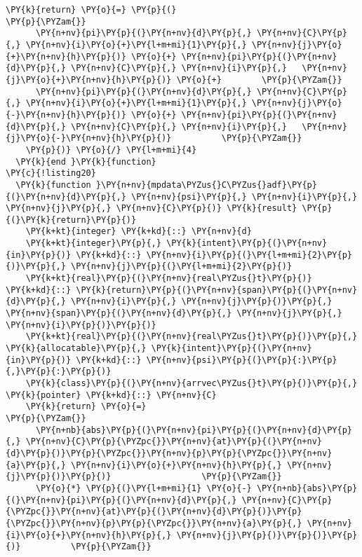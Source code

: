 \begin{Verbatim}[commandchars=\\\{\}]
    \PY{k}{return} \PY{o}{=} \PY{p}{(}                                         \PY{p}{\PYZam{}}
      \PY{n+nv}{pi}\PY{p}{(}\PY{n+nv}{d}\PY{p}{,} \PY{n+nv}{C}\PY{p}{,} \PY{n+nv}{i}\PY{o}{+}\PY{l+m+mi}{1}\PY{p}{,} \PY{n+nv}{j}\PY{o}{+}\PY{n+nv}{h}\PY{p}{)} \PY{o}{+} \PY{n+nv}{pi}\PY{p}{(}\PY{n+nv}{d}\PY{p}{,} \PY{n+nv}{C}\PY{p}{,} \PY{n+nv}{i}\PY{p}{,}   \PY{n+nv}{j}\PY{o}{+}\PY{n+nv}{h}\PY{p}{)} \PY{o}{+}        \PY{p}{\PYZam{}}
      \PY{n+nv}{pi}\PY{p}{(}\PY{n+nv}{d}\PY{p}{,} \PY{n+nv}{C}\PY{p}{,} \PY{n+nv}{i}\PY{o}{+}\PY{l+m+mi}{1}\PY{p}{,} \PY{n+nv}{j}\PY{o}{-}\PY{n+nv}{h}\PY{p}{)} \PY{o}{+} \PY{n+nv}{pi}\PY{p}{(}\PY{n+nv}{d}\PY{p}{,} \PY{n+nv}{C}\PY{p}{,} \PY{n+nv}{i}\PY{p}{,}   \PY{n+nv}{j}\PY{o}{-}\PY{n+nv}{h}\PY{p}{)}          \PY{p}{\PYZam{}}
    \PY{p}{)} \PY{o}{/} \PY{l+m+mi}{4}               
  \PY{k}{end }\PY{k}{function}
\PY{c}{!listing20}
  \PY{k}{function }\PY{n+nv}{mpdata\PYZus{}C\PYZus{}adf}\PY{p}{(}\PY{n+nv}{d}\PY{p}{,} \PY{n+nv}{psi}\PY{p}{,} \PY{n+nv}{i}\PY{p}{,} \PY{n+nv}{j}\PY{p}{,} \PY{n+nv}{C}\PY{p}{)} \PY{k}{result} \PY{p}{(}\PY{k}{return}\PY{p}{)}
    \PY{k+kt}{integer} \PY{k+kd}{::} \PY{n+nv}{d}
    \PY{k+kt}{integer}\PY{p}{,} \PY{k}{intent}\PY{p}{(}\PY{n+nv}{in}\PY{p}{)} \PY{k+kd}{::} \PY{n+nv}{i}\PY{p}{(}\PY{l+m+mi}{2}\PY{p}{)}\PY{p}{,} \PY{n+nv}{j}\PY{p}{(}\PY{l+m+mi}{2}\PY{p}{)}
    \PY{k+kt}{real}\PY{p}{(}\PY{n+nv}{real\PYZus{}t}\PY{p}{)} \PY{k+kd}{::} \PY{k}{return}\PY{p}{(}\PY{n+nv}{span}\PY{p}{(}\PY{n+nv}{d}\PY{p}{,} \PY{n+nv}{i}\PY{p}{,} \PY{n+nv}{j}\PY{p}{)}\PY{p}{,} \PY{n+nv}{span}\PY{p}{(}\PY{n+nv}{d}\PY{p}{,} \PY{n+nv}{j}\PY{p}{,} \PY{n+nv}{i}\PY{p}{)}\PY{p}{)}
    \PY{k+kt}{real}\PY{p}{(}\PY{n+nv}{real\PYZus{}t}\PY{p}{)}\PY{p}{,} \PY{k}{allocatable}\PY{p}{,} \PY{k}{intent}\PY{p}{(}\PY{n+nv}{in}\PY{p}{)} \PY{k+kd}{::} \PY{n+nv}{psi}\PY{p}{(}\PY{p}{:}\PY{p}{,}\PY{p}{:}\PY{p}{)} 
    \PY{k}{class}\PY{p}{(}\PY{n+nv}{arrvec\PYZus{}t}\PY{p}{)}\PY{p}{,} \PY{k}{pointer} \PY{k+kd}{::} \PY{n+nv}{C}
    \PY{k}{return} \PY{o}{=}                                           \PY{p}{\PYZam{}}
      \PY{n+nb}{abs}\PY{p}{(}\PY{n+nv}{pi}\PY{p}{(}\PY{n+nv}{d}\PY{p}{,} \PY{n+nv}{C}\PY{p}{\PYZpc{}}\PY{n+nv}{at}\PY{p}{(}\PY{n+nv}{d}\PY{p}{)}\PY{p}{\PYZpc{}}\PY{n+nv}{p}\PY{p}{\PYZpc{}}\PY{n+nv}{a}\PY{p}{,} \PY{n+nv}{i}\PY{o}{+}\PY{n+nv}{h}\PY{p}{,} \PY{n+nv}{j}\PY{p}{)}\PY{p}{)}                  \PY{p}{\PYZam{}}
      \PY{o}{*} \PY{p}{(}\PY{l+m+mi}{1} \PY{o}{-} \PY{n+nb}{abs}\PY{p}{(}\PY{n+nv}{pi}\PY{p}{(}\PY{n+nv}{d}\PY{p}{,} \PY{n+nv}{C}\PY{p}{\PYZpc{}}\PY{n+nv}{at}\PY{p}{(}\PY{n+nv}{d}\PY{p}{)}\PY{p}{\PYZpc{}}\PY{n+nv}{p}\PY{p}{\PYZpc{}}\PY{n+nv}{a}\PY{p}{,} \PY{n+nv}{i}\PY{o}{+}\PY{n+nv}{h}\PY{p}{,} \PY{n+nv}{j}\PY{p}{)}\PY{p}{)}\PY{p}{)}          \PY{p}{\PYZam{}}

\end{Verbatim}
